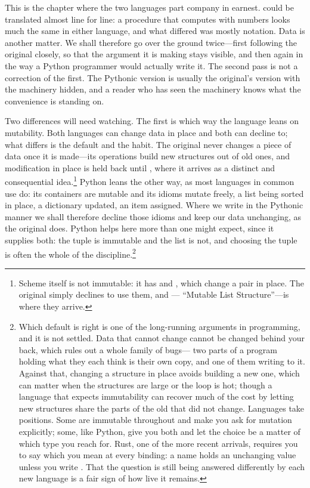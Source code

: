 This is the chapter where the two languages part company in earnest.
 could be translated almost line for line: a procedure that
computes with numbers looks much the same in either language, and what differed
was mostly notation.  Data is another matter.  We shall therefore go over the
ground twice---first following the original closely, so that the argument it is
making stays visible, and then again in the way a Python programmer would
actually write it.  The second pass is not a correction of the first.  The
Pythonic version is usually the original's version with the machinery hidden,
and a reader who has seen the machinery knows what the convenience is standing
on.

Two differences will need watching.  The first is which way the language leans
on mutability.  Both languages can change data in place and both can decline
to; what differs is the default and the habit.  The original never changes a
piece of data once it is made---its operations build new structures out of old
ones, and modification in place is held back until , where it
arrives as a distinct and consequential idea.\footnote{Scheme itself is not
immutable: it has  and , which change a pair in
place.  The original simply declines to use them, and ---%
``Mutable List Structure''---is where they arrive.} Python leans the other way,
as most languages in common use do: its containers are mutable and its idioms
mutate freely, a list being sorted in place, a dictionary updated, an item
assigned.  Where we write in the Pythonic manner we shall therefore decline
those idioms and keep our data unchanging, as the original does.  Python helps
here more than one might expect, since it supplies both: the tuple is immutable
and the list is not, and choosing the tuple is often the whole of the
discipline.\footnote{Which default is right is one of the long-running
arguments in programming, and it is not settled.  Data that cannot change
cannot be changed behind your back, which rules out a whole family of bugs---%
two parts of a program holding what they each think is their own copy, and one
of them writing to it.  Against that, changing a structure in place avoids
building a new one, which can matter when the structures are large or the loop
is hot; though a language that expects immutability can recover much of the
cost by letting new structures share the parts of the old that did not change.
Languages take positions.  Some are immutable throughout and make you ask for
mutation explicitly; some, like Python, give you both and let the choice be a
matter of which type you reach for.  Rust, one of the more recent arrivals,
requires you to say which you mean at every binding: a name holds an unchanging
value unless you write .  That the question is still being answered
differently by each new language is a fair sign of how live it remains.}

